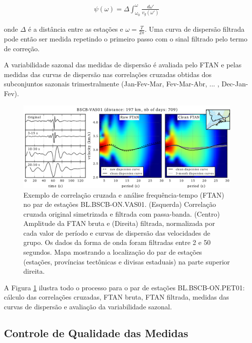 \begin{eqnarray}
\psi(\omega) = \Delta \int_{\omega_{0}}^{\omega} \frac{{d\omega}'}{v_{g}({\omega}')}
\end{eqnarray}

onde $\Delta$ é a distância entre as estações e $\omega = \frac{T}{2\pi}$. Uma curva de dispersão filtrada pode então ser medida repetindo o primeiro passo com o sinal filtrado pelo termo de correção.

A variabilidade sazonal das medidas de dispersão é avaliada pelo FTAN e pelas medidas das curvas de dispersão nas correlações cruzadas obtidas dos subconjuntos sazonais trimestralmente (Jan-Fev-Mar, Fev-Mar-Abr, ... , Dec-Jan-Fev). 

\begin{figure}[!ht]
\centering
\includegraphics[scale=0.8]{Figs/correlacao_FTAN.png}
\caption[Exemplo de correlação cruzada e análise frequência-tempo (FTAN) no par de estações BL.BSCB-ON.PET01.]{Exemplo de correlação cruzada e análise frequência-tempo (FTAN) no par de estações BL.BSCB-ON.VAS01. (Esquerda) Correlação cruzada original simetrizada e filtrada com passa-banda. (Centro) Amplitude da FTAN bruta e (Direita) filtrada, normalizada por cada valor de período e curvas de dispersão das velocidades de grupo. Os dados da forma de onda foram filtradas entre 2 e 50 segundos. Mapa mostrando a localização do par de estações (estações, províncias tectônicas e divisas estaduais) na parte superior direita.}
\label{correlacao_FTAN}
\end{figure}

A Figura \ref{correlacao_FTAN} ilustra todo o processo para o par de estações BL.BSCB-ON.PET01: cálculo das correlações cruzadas, FTAN bruta, FTAN filtrada, medidas das curvas de dispersão e avaliação da variabilidade sazonal. 

\subsection{Controle de Qualidade das Medidas}

